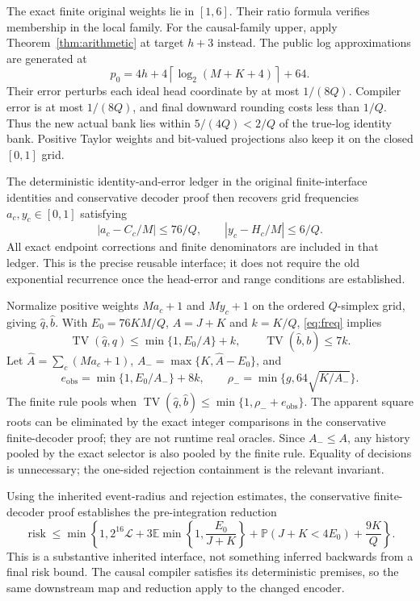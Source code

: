 \documentclass[11pt,letterpaper]{article}
\theoremstyle{definition}\newtheorem{definition}[theorem]{Definition}
\theoremstyle{remark}\newtheorem{remark}[theorem]{Remark}
\newcommand{\TV}{\operatorname{TV}}
\newcommand{\E}{\mathbb{E}}
\newcommand{\Prob}{\mathbb{P}}
\newcommand{\ceil}[1]{\left\lceil #1\right\rceil}
\begin{document}
The exact finite original weights lie in $[1,6]$. Their ratio formula verifies membership in the local family. For the causal-family upper, apply Theorem~\ref{thm:arithmetic} at target $h+3$ instead. The public log approximations are generated at
\[
 p_0=4h+4\ceil{\log_2(M+K+4)}+64.
\]
Their error perturbs each ideal head coordinate by at most $1/(8Q)$. Compiler error is at most $1/(8Q)$, and final downward rounding costs less than $1/Q$. Thus the new actual bank lies within $5/(4Q)<2/Q$ of the true-log identity bank. Positive Taylor weights and bit-valued projections also keep it on the closed $[0,1]$ grid.

The deterministic identity-and-error ledger in the original finite-interface identities and conservative decoder proof then recovers grid frequencies $a_c,y_c\in[0,1]$ satisfying
\begin{equation}\label{eq:freq}
 |a_c-C_c/M|\le76/Q,\qquad |y_c-H_c/M|\le6/Q.
\end{equation}
All exact endpoint corrections and finite denominators are included in that ledger. This is the precise reusable interface; it does not require the old exponential recurrence once the head-error and range conditions are established.

Normalize positive weights $Ma_c+1$ and $My_c+1$ on the ordered $Q$-simplex grid, giving $\widehat q,\widehat b$. With $E_0=76KM/Q$, $A=J+K$ and $k=K/Q$, \eqref{eq:freq} implies
\[
 \TV(\widehat q,q)\le\min\{1,E_0/A\}+k,\qquad
 \TV(\widehat b,b)\le7k.
\]
Let $\widehat A=\sum_c(Ma_c+1)$, $A_-=\max\{K,\widehat A-E_0\}$, and
\[
 e_{\mathrm{obs}}=\min\{1,E_0/A_-\}+8k,\qquad
 \rho_-=\min\{g,64\sqrt{K/A_-}\}.
\]
The finite rule pools when $\TV(\widehat q,\widehat b)\le\min\{1,\rho_-+e_{\mathrm{obs}}\}$. The apparent square roots can be eliminated by the exact integer comparisons in the conservative finite-decoder proof; they are not runtime real oracles. Since $A_-\le A$, any history pooled by the exact selector is also pooled by the finite rule. Equality of decisions is unnecessary; the one-sided rejection containment is the relevant invariant.

Using the inherited event-radius and rejection estimates, the conservative finite-decoder proof establishes the pre-integration reduction
\begin{equation}\label{eq:preint}
 \operatorname{risk}\le\min\left\{1,2^{16}\mathcal L+
 3\E\min\left\{1,\frac{E_0}{J+K}\right\}
 +\Prob(J+K<4E_0)+\frac{9K}{Q}\right\}.
\end{equation}
This is a substantive inherited interface, not something inferred backwards from a final risk bound. The causal compiler satisfies its deterministic premises, so the same downstream map and reduction apply to the changed encoder.
\end{document}

